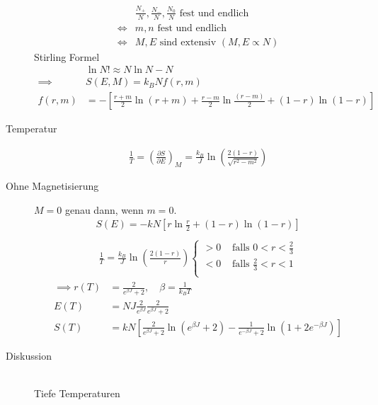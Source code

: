 \documentclass[11pt]{article}
\theoremstyle{plain}
\newcommand{\pd}[2]{\frac{\partial #1 }{\partial #2}}
\begin{document}
\begin{description}
    \begin{align*}
      & \frac{N_+}{N}, \frac{N_-}{N}, \frac{N_0}{N} \text{ fest und endlich } \\
      \iff & m,n \text{ fest und endlich} \\
      \iff & M,E \text{ sind extensiv } (M,E \propto N)
    \end{align*}
    Stirling Formel \begin{align*}
      & \ln{N!} \approx N \ln{N} - N \\
      \implies & S(E, M) = k_B N f(r, m) \\
      f(r, m ) & = - \left[ \frac{r+m}{2} \ln{(r+m)} + \frac{r - m}{2}
    \ln{\frac{(r - m)}{2}} + (1-r) \ln{(1 - r)} \right]
    \end{align*}
  \item[Temperatur]
    \begin{align*}
      \frac{1}{T} = \left( \pd{S}{E}  \right)_M = \frac{k_B}{J} 
      \ln{\left( \frac{2 (1-r)}{ \sqrt{r^2 - m^2}} \right)}
    \end{align*}
  \item[Ohne Magnetisierung] $M=0$ genau dann, wenn $m=0$.
    \begin{align*}
      S(E) = - k N [ r \ln{\frac{r}{2}} + (1-r) \ln{(1-r)}] \\
    \end{align*}
    \begin{align*}
      \frac{1}{T} = \frac{k_B}{ J } \ln{\left( \frac{2 ( 1-r)}{r} \right) }
       \begin{cases}
         > 0 & \text{ falls } 0 < r < \frac{2}{3} \\
         < 0 & \text{ falls }\frac{2}{3} < r < 1 \\
      \end{cases}
    \end{align*}
    \begin{align*}
      \implies  r (T) &= \frac{2}{e^{\beta J }+2 }, \quad  \beta= \frac{1}{k_B T} \\
                E(T)  &= NJ \frac{2}{e^{\beta J}} \frac{2}{e^{\beta J} + 2} \\
                S(T)  &= k N \left[ \frac{2}{e^{\beta J} + 2} \ln{(e^{\beta J} + 2)}
    - \frac{1}{e^{-\beta J} + 2} \ln{ \left( 1+ 2 e^{-\beta J} \right) }\right]
    \end{align*}
  \item[Diskussion] $ $  \\
    Tiefe Temperaturen \begin{align*}

\end{align*}
\end{description}
\end{document}
